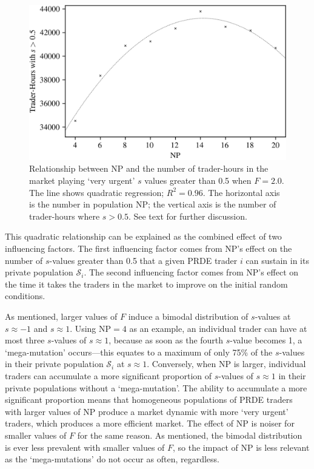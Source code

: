 \documentclass[conference]{IEEEtran}
\begin{document}
\begin{figure}[htbp]
    \centerline{\includegraphics[width=\columnwidth]{f=2.0_strats.png}}
    \caption{
        Relationship between $\mathrm{NP}$ and the number of trader-hours in the market playing `very urgent' $s$ values greater than 0.5 when $F=2.0$.
        The line shows quadratic regression; $R^2=0.96$.
        The horizontal axis is the number in population $\mathrm{NP}$; the vertical axis is the number of trader-hours where $s>0.5$.
        See text for further discussion.
    }
    \label{F=2.0_strats}
\end{figure}

This quadratic relationship can be explained as the combined effect of two influencing factors.
The first influencing factor comes from $\mathrm{NP}$'s effect on the number of $s$-values greater than 0.5 that a given PRDE trader $i$ can sustain in its private population $\mathcal{S}_i$.
The second influencing factor comes from $\mathrm{NP}$'s effect on the time it takes the traders in the market to improve on the initial random conditions.

As mentioned, larger values of $F$ induce a bimodal distribution of $s$-values at $s\approx -1$ and $s\approx 1$.
Using $\mathrm{NP}=\mathrm{4}$ as an example, an individual trader can have at most three $s$-values of $s\approx 1$, because as soon as the fourth $s$-value becomes 1, a `mega-mutation' occurs---this equates to a maximum of only 75\% of the $s$-values in their private population $\mathcal{S}_i$ at $s\approx 1$.
Conversely, when $\mathrm{NP}$ is larger, individual traders can accumulate a more significant proportion of $s$-values of $s\approx 1$ in their private populations without a `mega-mutation'.
The ability to accumulate a more significant proportion means that homogeneous populations of PRDE traders with larger values of $\mathrm{NP}$ produce a market dynamic with more `very urgent' traders, which produces a more efficient market.
The effect of $\mathrm{NP}$ is noiser for smaller values of $F$ for the same reason.
As mentioned, the bimodal distribution is ever less prevalent with smaller values of $F$, so the impact of $\mathrm{NP}$ is less relevant as the `mega-mutations' do not occur as often, regardless.
\end{document}
